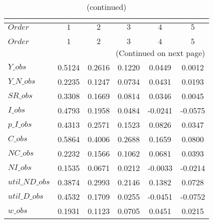  
\begin{center}
\begin{longtable}{lccccc} 
\caption{COEFFICIENTS OF AUTOCORRELATION}\\
 \label{Table:th_autocorr_matrix}\\
\toprule 
$Order          $	 & 	 $         1$	 & 	 $         2$	 & 	 $         3$	 & 	 $         4$	 & 	 $         5$\\
\midrule \endfirsthead 
\caption{(continued)}\\
 \toprule \\ 
$Order          $	 & 	 $         1$	 & 	 $         2$	 & 	 $         3$	 & 	 $         4$	 & 	 $         5$\\
\midrule \endhead 
\midrule \multicolumn{6}{r}{(Continued on next page)} \\ \bottomrule \endfoot 
\bottomrule \endlastfoot 
$Y\_obs         $	 & 	    0.5124	 & 	    0.2616	 & 	    0.1220	 & 	    0.0449	 & 	    0.0012 \\ 
$Y\_N\_obs      $	 & 	    0.2235	 & 	    0.1247	 & 	    0.0734	 & 	    0.0431	 & 	    0.0193 \\ 
$SR\_obs        $	 & 	    0.3308	 & 	    0.1669	 & 	    0.0814	 & 	    0.0346	 & 	    0.0045 \\ 
$I\_obs         $	 & 	    0.4793	 & 	    0.1958	 & 	    0.0484	 & 	   -0.0241	 & 	   -0.0575 \\ 
$p\_I\_obs      $	 & 	    0.4313	 & 	    0.2571	 & 	    0.1523	 & 	    0.0826	 & 	    0.0347 \\ 
$C\_obs         $	 & 	    0.5864	 & 	    0.4006	 & 	    0.2688	 & 	    0.1659	 & 	    0.0800 \\ 
$NC\_obs        $	 & 	    0.2232	 & 	    0.1566	 & 	    0.1062	 & 	    0.0681	 & 	    0.0393 \\ 
$NI\_obs        $	 & 	    0.1535	 & 	    0.0671	 & 	    0.0212	 & 	   -0.0033	 & 	   -0.0214 \\ 
$util\_ND\_obs  $	 & 	    0.3874	 & 	    0.2993	 & 	    0.2146	 & 	    0.1382	 & 	    0.0728 \\ 
$util\_D\_obs   $	 & 	    0.4532	 & 	    0.1709	 & 	    0.0255	 & 	   -0.0451	 & 	   -0.0752 \\ 
$w\_obs         $	 & 	    0.1931	 & 	    0.1123	 & 	    0.0705	 & 	    0.0451	 & 	    0.0215 \\ 
\end{longtable}
 \end{center}
